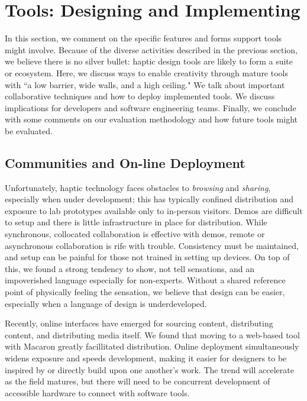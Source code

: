 \section{\haxd Tools: Designing and Implementing}
In this section, we comment on the specific features and forms \haxd support tools might involve.
Because of the diverse activities described in the previous section, we believe there is no silver bullet: haptic design tools are likely to form a suite or ecosystem.
Here, we discuss ways to enable creativity through mature tools with ``a low barrier, wide walls, and a high ceiling."
We talk about important collaborative techniques and how to deploy implemented tools.
We discuss implications for developers and software engineering teams.
Finally, we conclude with some comments on our evaluation methodology and how future \haxd tools might be evaluated.


\subsection{Communities and On-line Deployment}
Unfortunately, haptic technology faces obstacles to \emph{browsing} and \emph{sharing}, especially when under development; this has typically confined distribution and exposure to lab prototypes available only to in-person visitors.
Demos are difficult to setup and there is little infrastructure in place for distribution.
While synchronous, collocated collaboration is effective with demos, remote or asynchronous collaboration is rife with trouble.
Consistency must be maintained, and setup can be painful for those not trained in setting up devices.
On top of this, we found a strong tendency to show, not tell sensations, and an impoverished language especially for non-experts.
Without a shared reference point of physically feeling the sensation, we believe that design can be easier, especially when a language of design is underdeveloped.

Recently, online interfaces have emerged for sourcing content, distributing content, and distributing media itself. 
We found that moving to a web-based tool with Macaron greatly facillitated distribution.
Online deployment simultaneously widens exposure and speeds development, making it easier for designers to be inspired by or directly build upon one another's work. 
The trend will accelerate as the field matures, but there will need to be concurrent development of accessible hardware to connect with software tools.


